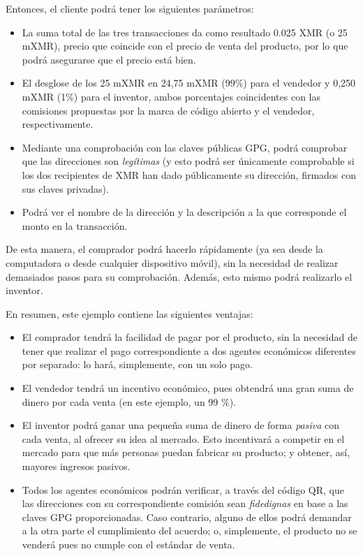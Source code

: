 \documentclass[12pt,a4paper]{article}
\begin{document}
Entonces, el cliente podrá tener los siguientes parámetros:

\begin{itemize}
\item La suma total de las tres transacciones da como resultado 0.025 XMR (o 25 mXMR), precio que coincide con el precio de venta del producto, por lo que podrá asegurarse que el precio está bien.
\item El desglose de los 25 mXMR en 24,75 mXMR (99\%) para el vendedor y 0,250 mXMR (1\%) para el inventor, ambos porcentajes coincidentes con las comisiones propuestas por la marca de código abierto y el vendedor, respectivamente.
\item Mediante una comprobación con las claves públicas GPG, podrá comprobar que las direcciones son \textit{legítimas} (y esto podrá ser únicamente comprobable si los dos recipientes de XMR han dado públicamente su dirección, firmados con sus claves privadas).
\item Podrá ver el nombre de la dirección y la descripción a la que corresponde el monto en la transacción.
\end{itemize}

De esta manera, el comprador podrá hacerlo rápidamente (ya sea desde la computadora o desde cualquier dispositivo móvil), sin la necesidad de realizar demasiados pasos para su comprobación. Además, esto mismo podrá realizarlo el inventor.

En resumen, este ejemplo contiene las siguientes ventajas:

\begin{itemize}
\item El comprador tendrá la facilidad de pagar por el producto, sin la necesidad de tener que realizar el pago correspondiente a dos agentes económicos diferentes por separado: lo hará, simplemente, con un solo pago.
\item El vendedor tendrá un incentivo económico, pues obtendrá una gran suma de dinero por cada venta (en este ejemplo, un 99 \%).
\item El inventor podrá ganar una pequeña suma de dinero de forma \textit{pasiva} con cada venta, al ofrecer su idea al mercado. Esto incentivará a competir en el mercado para que más personas puedan fabricar su producto; y obtener, así, mayores ingresos pasivos.
\item Todos los agentes económicos podrán verificar, a través del código QR, que las direcciones con su correspondiente comisión sean \textit{fidedignas} en base a las claves GPG proporcionadas. Caso contrario, alguno de ellos podrá demandar a la otra parte el cumplimiento del acuerdo; o, simplemente, el producto no se venderá pues no cumple con el estándar de venta.
\end{itemize}
\end{document}
